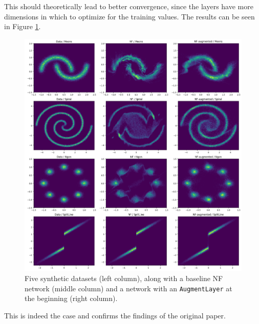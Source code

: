 This should theoretically lead to better convergence, since the layers have more dimensions in which to optimize for the training values.
The results can be seen in Figure \ref{fig:augment}.

\begin{figure}[H]
    \centering
    \includegraphics[width=.85\linewidth]{images/synthetic/augment.png}
    \caption{Five synthetic datasets (left column), along with a baseline NF network (middle column) and a network with an \texttt{AugmentLayer} at the beginning (right column).}
    \label{fig:augment}
\end{figure}

This is indeed the case and confirms the findings of the original paper.

\newpage

\label{sec:spatial_mnist}

